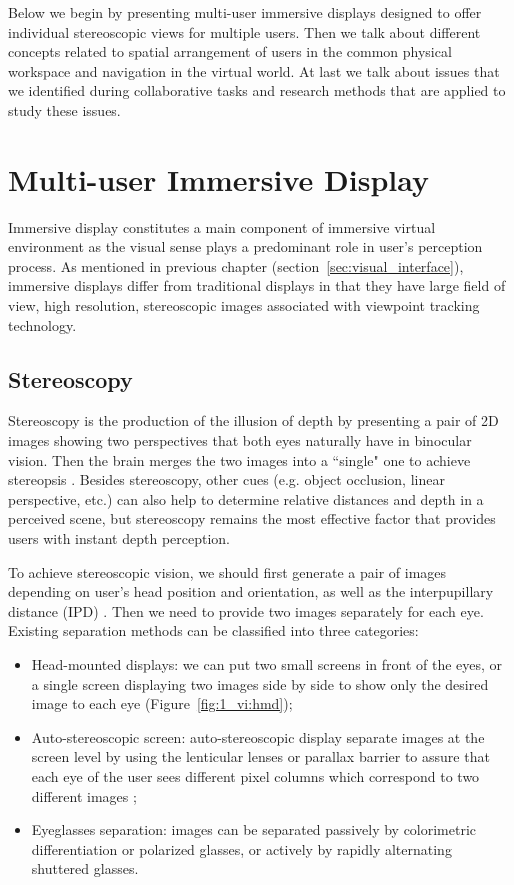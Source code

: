Below we begin by presenting multi-user immersive displays designed to offer individual stereoscopic views for multiple users. Then we talk about different concepts related to spatial arrangement of users in the common physical workspace and navigation in the virtual world. At last we talk about issues that we identified during collaborative tasks and research methods that are applied to study these issues.


\section{Multi-user Immersive Display}
Immersive display constitutes a main component of immersive virtual environment as the visual sense plays a predominant role in user's perception process. As mentioned in previous chapter (section~\ref{sec:visual_interface}), immersive displays differ from traditional displays in that they have large field of view, high resolution, stereoscopic images associated with viewpoint tracking technology.


\subsection{Stereoscopy}
\label{sec:stereo}

Stereoscopy is the production of the illusion of depth by presenting a pair of 2D images showing two perspectives that both eyes naturally have in binocular vision. Then the brain merges the two images into a ``single" one to achieve stereopsis \citep{Blake2006Perception}. Besides stereoscopy, other cues (e.g. object occlusion, linear perspective, etc.) can also help to determine relative distances and depth in a perceived scene, but stereoscopy remains the most effective factor that provides users with instant depth perception.

To achieve stereoscopic vision, we should first generate a pair of images depending on user's head position and orientation, as well as the interpupillary distance (IPD) \citep{Dodgson2004IPD}. Then we need to provide two images separately for each eye. Existing separation methods can be classified into three categories:

\begin{itemize}
\item Head-mounted displays: we can put two small screens in front of the eyes, or a single screen displaying two images side by side to show only the desired image to each eye (Figure~\ref{fig:1_vi:hmd});
\item Auto-stereoscopic screen: auto-stereoscopic display separate images at the screen level by using the lenticular lenses or parallax barrier to assure that each eye of the user sees different pixel columns which correspond to two different images \citep{Perlin2000Autostereo};
\item Eyeglasses separation: images can be separated passively by colorimetric differentiation or polarized glasses, or actively by rapidly alternating shuttered glasses.
\end{itemize}

